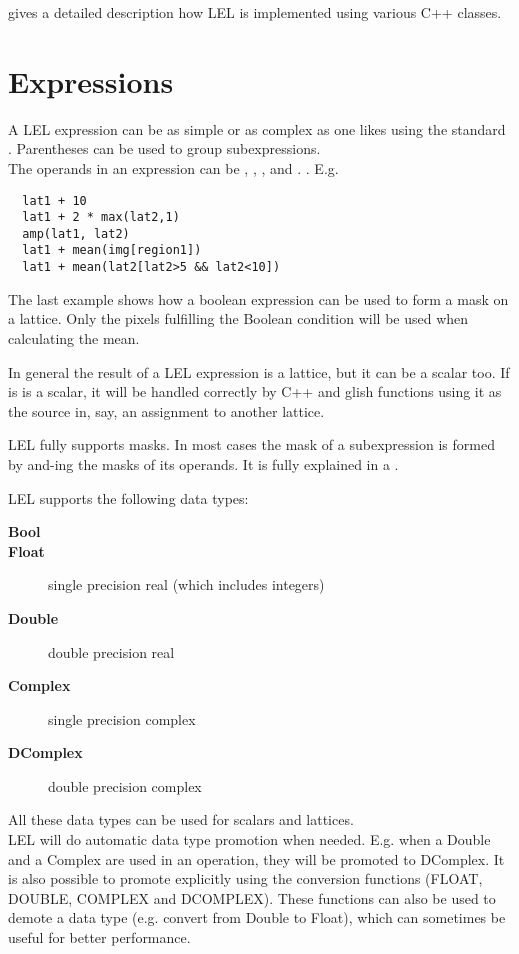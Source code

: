 \medskip\noindent {} gives
a detailed
description how LEL is implemented using various C++ classes.


\section{\label{LEL:EXPRESSIONS}Expressions}

A LEL expression can be as simple or as complex as one likes
using the standard
.
Parentheses can be used to group subexpressions.
\\The operands in an expression can be
,
,
, and
.
.
E.g.
\begin{verbatim}
  lat1 + 10
  lat1 + 2 * max(lat2,1)
  amp(lat1, lat2)
  lat1 + mean(img[region1])
  lat1 + mean(lat2[lat2>5 && lat2<10])
\end{verbatim}

The last example shows how a boolean expression can be used to form a
mask on a lattice.  Only the pixels fulfilling the Boolean condition
will be used when calculating the mean. 

\medskip\noindent In general the result of a LEL expression is a lattice, but it
can be a scalar too. If is is a scalar, it will be handled correctly
by C++ and glish functions using it as the source in, say, an
assignment to another lattice.

\medskip\noindent LEL fully supports masks. In most cases the mask of a
subexpression is formed by and-ing the masks of its operands.
It is fully explained in a .


\label{LEL:DATATYPES}
LEL supports the following data types:
\begin{description}
  \item[ \textbf{Bool}]
  \item[ \textbf{Float}] single precision real (which includes integers)
  \item[ \textbf{Double}] double precision real
  \item[ \textbf{Complex} ] single precision complex
  \item[ \textbf{DComplex} ] double precision complex
\end{description}
All these data types can be used for scalars and lattices.
\\LEL will do automatic data type promotion when needed. E.g. when
a Double and a Complex are used in an operation, they will be promoted
to DComplex. It is also possible to promote explicitly using the
conversion functions (FLOAT, DOUBLE, COMPLEX and DCOMPLEX).
These functions can also be used to demote a data type
(e.g. convert from Double to Float), which can sometimes
be useful for better performance.


